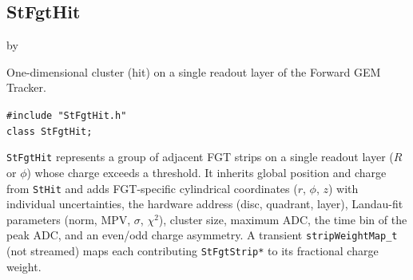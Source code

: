 \documentclass[twoside]{article}
\newcommand{\entrylabel}[1]{\mbox{\textbf{{#1}}}\hfil}%
\newenvironment{entry}
{\begin{list}{}%
    {\renewcommand{\makelabel}{\entrylabel}%
     \setlength{\labelwidth}{90pt}%
     \setlength{\leftmargin}{\labelwidth}
     \advance\leftmargin by \labelsep%
      }%
    }%
  {\end{list}}
\newcommand{\Entrylabel}[1]%
{\raisebox{0pt}[1ex][0pt]{\makebox[\labelwidth][l]%
    {\parbox[t]{\labelwidth}{\hspace{0pt}\textbf{{#1}}}}}}
\newenvironment{Entry}%
{\renewcommand{\entrylabel}{\Entrylabel}\begin{entry}}%
  {\end{entry}}
\begin{document}
\subsection{StFgtHit}
\label{sec:StFgtHit}
\begin{Entry}
\item[Summary] One-dimensional cluster (hit) on a single readout layer of the Forward GEM
  Tracker.
\item[Synopsis]
    \verb+#include "StFgtHit.h"+\\
    \verb+class StFgtHit;+\\
\item[Description]
  \texttt{StFgtHit} represents a group of adjacent FGT strips on a single readout layer
  ($R$ or $\phi$) whose charge exceeds a threshold.  It inherits global position and
  charge from \texttt{StHit} and adds FGT-specific cylindrical coordinates ($r$, $\phi$,
  $z$) with individual uncertainties, the hardware address (disc, quadrant, layer),
  Landau-fit parameters (norm, MPV, $\sigma$, $\chi^2$), cluster size, maximum ADC, the
  time bin of the peak ADC, and an even/odd charge asymmetry.  A transient
  \texttt{stripWeightMap\_t} (not streamed) maps each contributing \texttt{StFgtStrip*}
  to its fractional charge weight.


\end{Entry}
\end{document}
